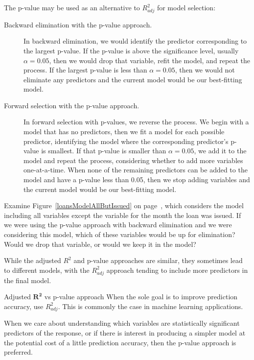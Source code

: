 \noindent%
The p-value may be used as an alternative to $R_{adj}^2$
for model selection:
\begin{description}
\item[Backward elimination with the p-value approach.]
    In backward elimination, we would identify the predictor
    corresponding to the largest p-value.
    If the p-value is above the significance level,
    usually $\alpha = 0.05$, then we would drop that variable,
    refit the model, and repeat the process.
    If the largest p-value is less than $\alpha = 0.05$,
    then we would not eliminate any predictors and the current
    model would be our best-fitting model.
\item[Forward selection with the p-value approach.]
    In forward selection with p-values, we reverse the process.
    We begin with a model that has no predictors, then we fit
    a model for each possible predictor, identifying the model
    where the corresponding predictor's p-value is smallest.
    If that p-value is smaller than $\alpha = 0.05$, we add
    it to the model and repeat the process, considering whether
    to add more variables one-at-a-time.
    When none of the remaining predictors can be added to the
    model and have a p-value less than 0.05,
    then we stop adding variables and the current model would
    be our best-fitting model.
\end{description}

\begin{exercisewrap}
\begin{nexercise}
Examine Figure~\ref{loansModelAllButIssued} on
page~\pageref{loansModelAllButIssued}, which considers the
model including all variables except the variable for the month
the loan was issued.
If we were using the p-value approach with backward elimination
and we were considering this model, which of these variables
would be up for elimination?
Would we drop that variable, or would we keep it in the
model?\footnotemark
\end{nexercise}
\end{exercisewrap}

While the adjusted $R^2$ and p-value approaches are similar,
they sometimes lead to different models, with the $R_{adj}^2$
approach tending to include more predictors in the final model.

\begin{onebox}{Adjusted $\pmb{R^2}$ vs p-value approach}
  When the sole goal is to improve prediction accuracy,
  use $R_{adj}^2$.
  This is commonly the case in machine learning
  applications.\vspace{3mm}

  When we care about understanding which variables are
  statistically significant predictors of the response,
  or if there is interest in producing a simpler model
  at the potential cost of a little prediction accuracy,
  then the p-value approach is preferred.
\end{onebox}

